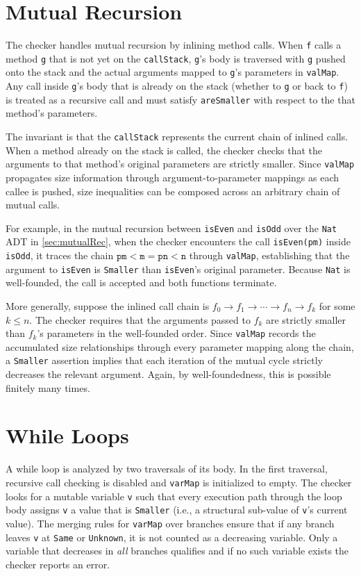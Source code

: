 \section{Mutual Recursion}
The checker handles mutual recursion by inlining method calls. When \texttt{f}
calls a method \texttt{g} that is not yet on the \texttt{callStack},
\texttt{g}'s body is traversed with \texttt{g} pushed onto the stack and the
actual arguments mapped to \texttt{g}'s parameters in \texttt{valMap}. Any call
inside \texttt{g}'s body that is already on the stack (whether to \texttt{g} or
back to \texttt{f}) is treated as a recursive call and must satisfy
\texttt{areSmaller} with respect to the that method's parameters.

The invariant is that the \texttt{callStack} represents the current
chain of inlined calls. When a method already on the stack is called, the
checker checks that the arguments to that method's original parameters are
strictly smaller. Since \texttt{valMap} propagates size information through
argument-to-parameter mappings as each callee is pushed, size inequalities can
be composed across an arbitrary chain of mutual calls.

For example, in the mutual recursion between \texttt{isEven} and
\texttt{isOdd} over the \texttt{Nat} ADT in \autoref{sec:mutualRec}, when the
checker encounters the call \texttt{isEven(pm)} inside \texttt{isOdd}, it traces
the chain $\texttt{pm} < \texttt{m} = \texttt{pn} < \texttt{n}$ through
\texttt{valMap}, establishing that the argument to \texttt{isEven} is
\texttt{Smaller} than \texttt{isEven}'s original parameter. Because \texttt{Nat}
is well-founded, the call is accepted and both functions terminate.

More generally, suppose the inlined call chain is
$f_0 \to f_1 \to \cdots \to f_n \to f_k$ for some $k \leq n$.
The checker requires that the arguments passed to $f_k$ are strictly smaller
than $f_k$'s parameters in the well-founded order. Since \texttt{valMap} records
the accumulated size relationships through every parameter mapping along the
chain, a \texttt{Smaller} assertion implies that each iteration of the mutual
cycle strictly decreases the relevant argument. Again, by well-foundedness, this
is possible finitely many times.


\section{While Loops}
A while loop is analyzed by two traversals of its body. In the first traversal,
recursive call checking is disabled and \texttt{varMap} is initialized to empty.
The checker looks for a mutable variable \texttt{v} such that every execution
path through the loop body assigns \texttt{v} a value that is \texttt{Smaller}
(i.e., a structural sub-value of \texttt{v}'s current value).
The merging rules for \texttt{varMap} over branches ensure that if any branch
leaves \texttt{v} at \texttt{Same} or \texttt{Unknown}, it is not counted as a
decreasing variable. Only a variable that decreases in \emph{all} branches
qualifies and if no such variable exists the checker reports an error.

